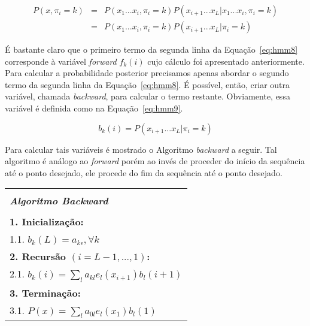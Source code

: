 \begin{equation}\label{eq:hmm8}
    \begin{array}{lcl} 
        P(x, \pi_i = k) & = & P(x_1 ... x_i, \pi_i = k) P(x_{i+1} ... x_L | x_1 ... x_i, \pi_i = k) \\ 
                        & = & P(x_1 ... x_i, \pi_i = k) P(x_{i+1} ... x_L | \pi_i = k)
    \end{array}
\end{equation}

É bastante claro que o primeiro termo da segunda linha da Equação~\ref{eq:hmm8} corresponde à variável \emph{forward} $ f_k(i) $ cujo cálculo foi apresentado anteriormente. Para calcular a probabilidade posterior precisamos apenas abordar o segundo termo da segunda linha da Equação~\ref{eq:hmm8}. É possível, então, criar outra variável, chamada \emph{backward}, para calcular o termo restante. Obviamente, essa variável é definida como na Equação~\ref{eq:hmm9}.

\begin{equation}\label{eq:hmm9}
    b_k(i) = P(x_{i+1} ... x_L | \pi_i = k)
\end{equation}

Para calcular tais variáveis é mostrado o Algoritmo \emph{backward} a seguir. Tal algoritmo é análogo ao \emph{forward} porém ao invés de proceder do início da sequência até o ponto desejado, ele procede do fim da sequência até o ponto desejado.

\begin{center}
  \begin{spacing}{1.0}
    \begin{tabular}{l}
      \hline \\[-0.25cm]
      \hspace{1.3cm} {\large {\bf \emph{ Algoritmo Backward } } } \hspace{1.3cm} \\[0.1cm]
      \hline \\[-0.25cm]
      \hspace{0.2cm} {\bf 1. Inicialização:} \\
      \hspace{0.9cm} 1.1. $ b_k(L) = a_{k\epsilon}, \forall k $ \\
      \hspace{0.2cm} {\bf 2. Recursão $ (i = L-1, ..., 1) $:} \\
      \hspace{0.9cm} 2.1. $ b_k(i) = \sum_{l}{a_{kl} e_l(x_{i+1}) b_l(i+1)} $ \\
      \hspace{0.2cm} {\bf 3. Terminação:} \\
      \hspace{0.9cm} 3.1. $ P(x) = \sum_{l}{a_{0l} e_l(x_1) b_l(1)} $ \\[0.1cm]
      \hline
    \end{tabular}
  \end{spacing}
\end{center}

